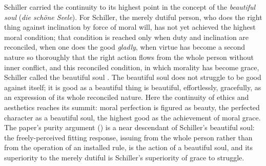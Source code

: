 Schiller carried the continuity to its highest point in the concept of the \emph{beautiful soul} (\emph{die sch\"one Seele}). For Schiller, the merely dutiful person, who does the right thing against inclination by force of moral will, has not yet achieved the highest moral condition; that condition is reached only when duty and inclination are reconciled, when one does the good \emph{gladly}, when virtue has become a second nature so thoroughly that the right action flows from the whole person without inner conflict, and this reconciled condition, in which morality has become grace, Schiller called the beautiful soul \parencite{schiller1967,schiller_naive}. The beautiful soul does not struggle to be good against itself; it is good as a beautiful thing is beautiful, effortlessly, gracefully, as an expression of its whole reconciled nature. Here the continuity of ethics and aesthetics reaches its summit: moral perfection is figured as beauty, the perfected character as a beautiful soul, the highest good as the achievement of moral grace. The paper's purity argument () is a near descendant of Schiller's beautiful soul: the freely-perceived fitting response, issuing from the whole person rather than from the operation of an installed rule, is the action of a beautiful soul, and its superiority to the merely dutiful is Schiller's superiority of grace to struggle.

